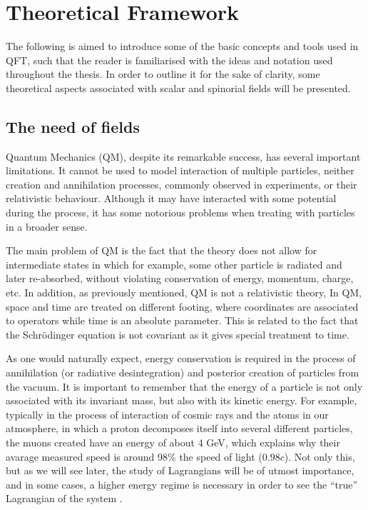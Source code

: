 \clearpage
\vspace{1cm}
\section{Theoretical Framework} \label{sec:teo}
\vspace{1cm}

The following is aimed to introduce some of the basic concepts and tools used in QFT, such that the reader is familiarised with the ideas and notation used throughout the thesis. In order to outline it for the sake of clarity, some theoretical aspects associated with scalar and spinorial fields will be presented.

\subsection{The need of fields} \label{ssec:theneedoffields}

Quantum Mechanics (QM), despite its remarkable success, has several important limitations. It cannot be used to model interaction of multiple particles, neither creation and annihilation processes, commonly observed in experiments, or their relativistic behaviour. Although it may have interacted with some potential during the process, it has some notorious problems when treating with particles in a broader sense.

The main problem of QM is the fact that the theory does not allow for intermediate states in which for example, some other particle is radiated and later re-absorbed, without violating conservation of energy, momentum, charge, etc. In addition, as previously mentioned, QM is not a relativistic theory, In QM, space and time are treated on different footing, where coordinates are associated to operators while time is an absolute parameter. This is related to the fact that the Schrödinger equation is not covariant as it gives special treatment to time.

As one would naturally expect, energy conservation is required in the process of annihilation (or radiative desintegration) and posterior creation of particles from the vacuum. It is important to remember that the energy of a particle is not only associated with its invariant mass, but also with its kinetic energy. For example, typically in the process of interaction of cosmic rays and the atoms in our atmosphere, in which a proton decomposes itself into several different particles, the muons created have an energy of about 4 GeV, which explains why their avarage measured speed is around 98\% the speed of light ($0.98c$). Not only this, but as we will see later, the study of Lagrangians will be of utmost importance, and in some cases, a higher energy regime is necessary in order to see the ``true'' Lagrangian of the system \cite{Goldberg}\cite{Lahiri}.

